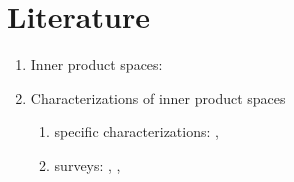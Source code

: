 \section{Literature}
\begin{survey}
\begin{enumerate}
  \item Inner product spaces: 

  \item Characterizations of inner product spaces
    \begin{enumerate}
      \item specific characterizations:
        ,

      \item surveys:
        ,
        ,
    \end{enumerate}
\end{enumerate}
\end{survey}

